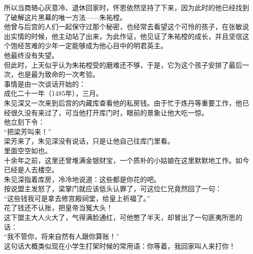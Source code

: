 \begin{multicols}{\theparacolNo}
所以当商辂心灰意冷、退休回家时，怀恩依然坚持了下来，因为此时的他已经找到了破解这片黑幕的唯一方法——朱祐樘。\\

他曾与后宫的人们一起保守过那个秘密，也经常去看望这个可怜的孩子，在张敏说出实情的时候，他主动站了出来，为此作证，他见证了朱祐樘的成长，并且坚信这个饱经苦难的少年一定能够成为他心目中的明君英主。\\

他最终没有失望。\\

但此时，上天似乎认为朱祐樘受的磨难还不够，于是，它为这个孩子安排了最后一次，也是最为致命的一次考验。\\

事情是由一次谈话开始的：\\

成化二十一年（1485年），三月。\\

朱见深又一次来到后宫的内藏库查看他的私房钱。由于忙于炼丹等重要工作，他已经很久没有来过了，可当他打开库门时，眼前的景象让他大吃一惊。\\

他立刻下令：\\

“把梁芳叫来！”\\

梁芳来了，朱见深没有说话，只是让他自己往库门里看。\\

里面空空如也。\\

十余年之前，这里还曾堆满金银财宝，一个质朴的小姑娘在这里默默地工作。如今已经是人去楼空。\\

朱见深指着库房，冷冷地说道：这些都是你花的吧。\\

按说盟主发怒了，梁掌门就应该低头认罪了，可这位仁兄竟然回了一句：\\

“这些钱我可是拿去修宫殿祠堂，给皇上祈福了。”\\

花了钱还不认账，把皇帝当冤大头！\\

这下盟主大人火大了，气得满脸通红，可他憋了半天，却冒出了一句匪夷所思的话：\\

“我不管你，将来自然有人跟你算账！”\\

这句话大概类似现在小学生打架时候的常用语：你等着，我回家叫人来打你！\\


\end{multicols}
